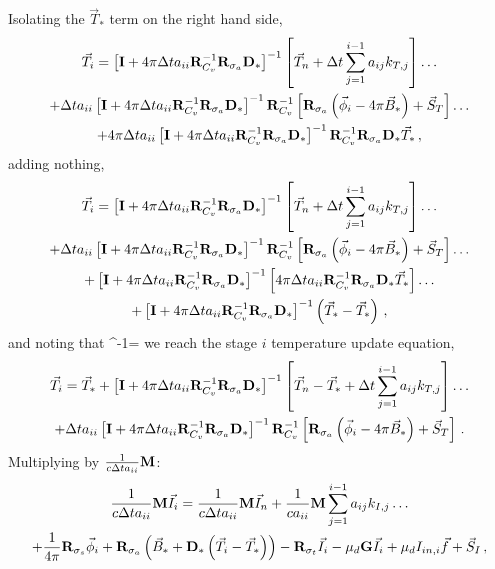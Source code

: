 %
Isolating the $\vec{T}_*$ term on the right hand side,
%
\begin{multline}
\vec{T}_i = \left[ \mathbf{I}  +4\pi\Delta t a_{ii}\mathbf{R}_{C_v}^{-1}\mathbf{R}_{\sigma_a} \mathbf{D}_*   \right]^{-1}\left[\vec{T}_n + \Delta t \sum_{j=1}^{i-1}{a_{ij} k_{T,j}   }\right] \dots \\
+ \Delta t a_{ii}\left[ \mathbf{I}  +4\pi\Delta t a_{ii}\mathbf{R}_{C_v}^{-1}\mathbf{R}_{\sigma_a} \mathbf{D}_*   \right]^{-1}
\mathbf{R}_{C_v}^{-1}\left[ \mathbf{R}_{\sigma_a}\left(\vec{\phi}_i - 4\pi\vec{B}_*\right)  + \vec{S}_T \right]\dots \\
+4\pi\Delta t a_{ii}\left[ \mathbf{I}  + 4\pi\Delta t a_{ii}\mathbf{R}_{C_v}^{-1}\mathbf{R}_{\sigma_a} \mathbf{D}_*   \right]^{-1}
\mathbf{R}_{C_v}^{-1}\mathbf{R}_{\sigma_a} \mathbf{D}_* \vec{T}_* \, ,
\end{multline}
%
%
adding nothing,
\begin{multline}
\vec{T}_i = \left[ \mathbf{I}  + 4\pi\Delta t a_{ii}\mathbf{R}_{C_v}^{-1}\mathbf{R}_{\sigma_a} \mathbf{D}_*   \right]^{-1}\left[\vec{T}_n + \Delta t \sum_{j=1}^{i-1}{a_{ij} k_{T,j}   }\right] \dots \\
+ \Delta t a_{ii}\left[ \mathbf{I} + 4\pi\Delta t a_{ii}\mathbf{R}_{C_v}^{-1}\mathbf{R}_{\sigma_a} \mathbf{D}_*   \right]^{-1}
\mathbf{R}_{C_v}^{-1}\left[\mathbf{R}_{\sigma_a} \left(\vec{\phi}_i -  4\pi\vec{B}_*\right) + \vec{S}_T \right]\dots \\
+\left[ \mathbf{I} + 4\pi\Delta t a_{ii}\mathbf{R}_{C_v}^{-1}\mathbf{R}_{\sigma_a} \mathbf{D}_*   \right]^{-1}
\left[ 4\pi\Delta t a_{ii} \mathbf{R}_{C_v}^{-1}\mathbf{R}_{\sigma_a}   \mathbf{D}_* \vec{T}_* \right]\dots \\
+ \left[ \mathbf{I}  + 4\pi\Delta t a_{ii}\mathbf{R}_{C_v}^{-1}\mathbf{R}_{\sigma_a} \mathbf{D}_*   \right]^{-1} \left( \vec{T}_* - \vec{T}_*\right) \, ,
\end{multline}
%
%
and noting that
\benum
{}^{-1} = \I \pec
\eenum
%
%
we reach the stage $i$ temperature update equation,
\begin{multline}
\vec{T}_i = \vec{T}_*   + \left[ \mathbf{I} + 4\pi\Delta t a_{ii}\mathbf{R}_{C_v}^{-1}\mathbf{R}_{\sigma_a} \mathbf{D}_*   \right]^{-1}\left[\vec{T}_n -\vec{T}_* + \Delta t \sum_{j=1}^{i-1}{a_{ij} k_{T,j}   }\right] \dots \\
+ \Delta t a_{ii}\left[ \mathbf{I}  + 4\pi\Delta t a_{ii}\mathbf{R}_{C_v}^{-1}\mathbf{R}_{\sigma_a} \mathbf{D}_*   \right]^{-1}\mathbf{R}_{C_v}^{-1}
\left[ \mathbf{R}_{\sigma_a}\left(\vec{\phi}_i - 4\pi\vec{B}_*  \right) + \vec{S}_T \right] \, .
\label{eq:Ti_iso}
\end{multline}
%
Multiplying  by $\frac{1}{c\Delta t a_{ii}} \mathbf M$:
\begin{multline}
\frac{1}{c\Delta t a_{ii}} \mathbf M\vec{I}_i = \frac{1}{c\Delta t a_{ii}} \mathbf M\vec{I}_n + \frac{1}{c a_{ii}}  \mathbf M \sum_{j=1}^{i-1}{a_{ij} k_{I,j}   } \dots \\
+ 
\frac{1}{4\pi}\mathbf{R}_{\sigma_s}\vec{\phi}_i + 
\mathbf{R}_{\sigma_a}\left(\vec{B}_* +  \mathbf{D}_* \left(\vec{T}_i -\vec{T}_*  \right)   \right)- \mathbf{R}_{\sigma_t} \vec{I}_i - \mu_d\mathbf{G}\vec{I}_i + \mu_d I_{in,i} \vec{f}+ \vec{S}_I \, ,
\label{eq:kIi_second}
\end{multline}
